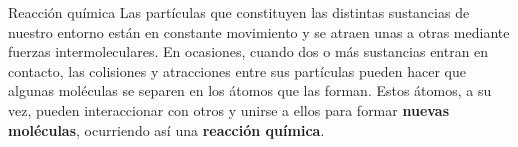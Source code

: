 \begin{infocard}{Reacción química}
    Las partículas que constituyen las distintas sustancias de nuestro entorno están en constante
    movimiento y se atraen unas a otras mediante fuerzas intermoleculares. En ocasiones,
    cuando dos o más sustancias entran en contacto, las colisiones y atracciones
    entre sus partículas pueden hacer que algunas moléculas se separen en los átomos que
    las forman. Estos átomos, a su vez, pueden interaccionar con otros y unirse a ellos para
    formar \textbf{nuevas moléculas}, ocurriendo así una \textbf{reacción química}.
\end{infocard}
